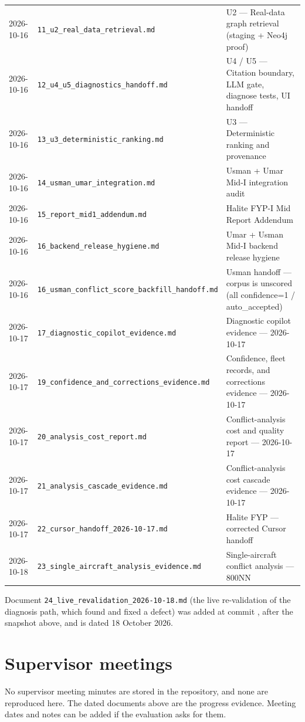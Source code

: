 \begin{longtable}{p{}p{}p{}}
2026-10-16 & \texttt{11\_u2\_real\_data\_retrieval.md} & U2 --- Real-data graph retrieval (staging + Neo4j proof) \\
2026-10-16 & \texttt{12\_u4\_u5\_diagnostics\_handoff.md} & U4 / U5 --- Citation boundary, LLM gate, diagnose tests, UI handoff \\
2026-10-16 & \texttt{13\_u3\_deterministic\_ranking.md} & U3 --- Deterministic ranking and provenance \\
2026-10-16 & \texttt{14\_usman\_umar\_integration.md} & Usman + Umar Mid-I integration audit \\
2026-10-16 & \texttt{15\_report\_mid1\_addendum.md} & Halite FYP-I Mid Report Addendum \\
2026-10-16 & \texttt{16\_backend\_release\_hygiene.md} & Umar + Usman Mid-I backend release hygiene \\
2026-10-16 & \texttt{16\_usman\_conflict\_score\_backfill\_handoff.md} & Usman handoff --- corpus is unscored (all confidence=1 / auto\_accepted) \\
2026-10-17 & \texttt{17\_diagnostic\_copilot\_evidence.md} & Diagnostic copilot evidence --- 2026-10-17 \\
2026-10-17 & \texttt{19\_confidence\_and\_corrections\_evidence.md} & Confidence, fleet records, and corrections evidence --- 2026-10-17 \\
2026-10-17 & \texttt{20\_analysis\_cost\_report.md} & Conflict-analysis cost and quality report --- 2026-10-17 \\
2026-10-17 & \texttt{21\_analysis\_cascade\_evidence.md} & Conflict-analysis cost cascade evidence --- 2026-10-17 \\
2026-10-17 & \texttt{22\_cursor\_handoff\_2026-10-17.md} & Halite FYP --- corrected Cursor handoff \\
2026-10-18 & \texttt{23\_single\_aircraft\_analysis\_evidence.md} & Single-aircraft conflict analysis --- 800NN \\
\bottomrule
\end{longtable}
Document \texttt{24\_live\_revalidation\_2026-10-18.md} (the live re-validation of the diagnosis path, which found and fixed a defect) was added at commit , after the snapshot above, and is dated 18 October 2026.

\section*{Supervisor meetings}
No supervisor meeting minutes are stored in the repository, and none are reproduced here. The dated documents above are the progress evidence. Meeting dates and notes can be added if the evaluation asks for them.
